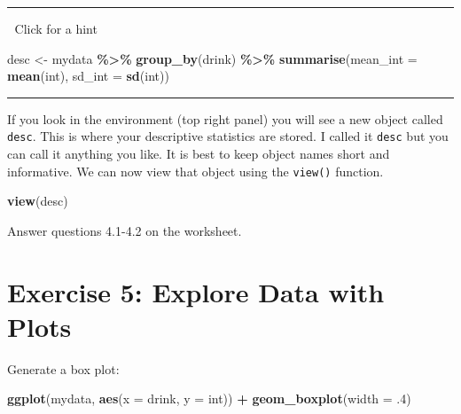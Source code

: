\documentclass[
]{book}
\newenvironment{Shaded}{\begin{snugshade}}{\end{snugshade}}
\newcommand{\AttributeTok}[1]{\textcolor[rgb]{0.13,0.29,0.53}{#1}}
\newcommand{\DecValTok}[1]{\textcolor[rgb]{0.00,0.00,0.81}{#1}}
\newcommand{\FunctionTok}[1]{\textcolor[rgb]{0.13,0.29,0.53}{\textbf{#1}}}
\newcommand{\NormalTok}[1]{#1}
\newcommand{\OtherTok}[1]{\textcolor[rgb]{0.56,0.35,0.01}{#1}}
\newcommand{\SpecialCharTok}[1]{\textcolor[rgb]{0.81,0.36,0.00}{\textbf{#1}}}
\let\oldsection\section
\renewcommand{\section}{\needspace{5\baselineskip}\oldsection}
\begin{document}
\begin{center}\rule{0.5\linewidth}{0.5pt}\end{center}

👀 Click for a hint

\begin{Shaded}
\begin{Highlighting}[]
\NormalTok{desc }\OtherTok{\textless{}{-}}\NormalTok{  mydata }\SpecialCharTok{\%\textgreater{}\%}
  \FunctionTok{group\_by}\NormalTok{(drink) }\SpecialCharTok{\%\textgreater{}\%}
  \FunctionTok{summarise}\NormalTok{(}\AttributeTok{mean\_int =} \FunctionTok{mean}\NormalTok{(int),}
            \AttributeTok{sd\_int =} \FunctionTok{sd}\NormalTok{(int))}
\end{Highlighting}
\end{Shaded}

\begin{center}\rule{0.5\linewidth}{0.5pt}\end{center}

If you look in the environment (top right panel) you will see a new object called \texttt{desc}. This is where your descriptive statistics are stored. I called it \texttt{desc} but you can call it anything you like. It is best to keep object names short and informative. We can now view that object using the \texttt{view()} function.

\begin{Shaded}
\begin{Highlighting}[]
\FunctionTok{view}\NormalTok{(desc)}
\end{Highlighting}
\end{Shaded}

Answer questions 4.1-4.2 on the worksheet.

\section{Exercise 5: Explore Data with Plots}\label{exercise-5-explore-data-with-plots}

Generate a box plot:

\begin{Shaded}
\begin{Highlighting}[]
\FunctionTok{ggplot}\NormalTok{(mydata, }\FunctionTok{aes}\NormalTok{(}\AttributeTok{x =}\NormalTok{ drink, }\AttributeTok{y =}\NormalTok{ int)) }\SpecialCharTok{+}
  \FunctionTok{geom\_boxplot}\NormalTok{(}\AttributeTok{width =}\NormalTok{ .}\DecValTok{4}\NormalTok{)}
\end{Highlighting}
\end{Shaded}
\end{document}
